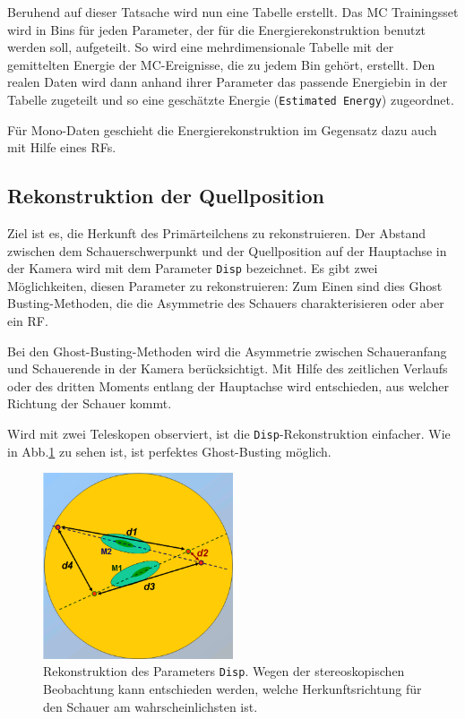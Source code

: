 Beruhend auf dieser Tatsache wird nun eine Tabelle erstellt.
Das MC Trainingsset wird in Bins für jeden Parameter, der für die Energierekonstruktion benutzt werden soll, aufgeteilt.
So wird eine mehrdimensionale Tabelle mit der gemittelten Energie der MC-Ereignisse, die zu jedem Bin gehört, erstellt.
Den realen Daten wird dann anhand ihrer Parameter das passende Energiebin in der Tabelle zugeteilt und so eine geschätzte Energie (\texttt{Estimated Energy}) zugeordnet.

Für Mono-Daten geschieht die Energierekonstruktion im Gegensatz dazu auch mit Hilfe eines RFs.


\subsection{Rekonstruktion der Quellposition}
Ziel ist es, die Herkunft des Primärteilchens zu rekonstruieren. 
Der Abstand zwischen dem Schauerschwerpunkt und der Quellposition auf der Hauptachse in der Kamera wird mit dem Parameter \texttt{Disp} bezeichnet.
Es gibt zwei Möglichkeiten, diesen Parameter zu rekonstruieren: Zum Einen sind dies Ghost Busting-Methoden, die die Asymmetrie des Schauers charakterisieren oder aber ein RF.

Bei den Ghost-Busting-Methoden wird die Asymmetrie zwischen Schaueranfang und Schauerende in der Kamera berücksichtigt.
Mit Hilfe des zeitlichen Verlaufs oder des dritten Moments entlang der Hauptachse wird entschieden, aus welcher Richtung der Schauer kommt.

Wird mit zwei Teleskopen observiert, ist die \texttt{Disp}-Rekonstruktion einfacher.
Wie in Abb.\ref{Disp} zu sehen ist, ist perfektes Ghost-Busting möglich.

\begin{figure}
    \centering
    \includegraphics[width=0.5\textwidth]{./Plots/04_MrkAnalyse/Disp.png}
    \caption{Rekonstruktion des Parameters \texttt{Disp}. 
    Wegen der stereoskopischen Beobachtung kann entschieden werden, welche Herkunftsrichtung für den Schauer am wahrscheinlichsten ist.\cite{DispRekonstruktion}}
    \label{Disp}
\end{figure}

